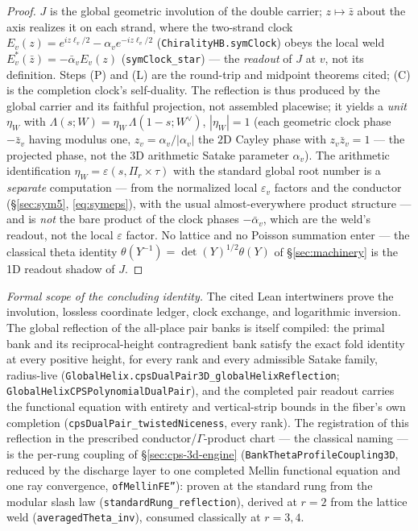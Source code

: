 \documentclass[11pt]{article}
\theoremstyle{definition}
\begin{document}
\begin{proof}
$J$ is the global geometric involution of the double carrier; $z\mapsto\bar z$ about the axis realizes it on
each strand, where the two-strand clock $E_v(z)=e^{iz\ell_v/2}-\alpha_v e^{-iz\ell_v/2}$
(\texttt{ChiralityHB.symClock}) obeys the local weld $E_v^{*}(\bar z)=-\bar\alpha_v E_v(z)$
(\texttt{symClock\_star}) --- the \emph{readout} of $J$ at $v$, not its definition. Steps (P) and (L) are the
round-trip and midpoint theorems cited; (C) is the completion clock's self-duality. The reflection is thus
produced by the global carrier and its faithful projection, not assembled placewise; it yields a \emph{unit}
$\eta_W$ with $\Lambda(s;W)=\eta_W\,\Lambda(1-s;W^\vee)$, $|\eta_W|=1$ (each geometric clock phase
$-\bar z_v$ having modulus one, $z_v=\alpha_v/|\alpha_v|$ the $2$D Cayley phase with $z_v\bar z_v=1$ --- the
projected phase, not the $3$D arithmetic Satake parameter $\alpha_v$). The arithmetic identification
$\eta_W=\varepsilon(s,\Pi_r\times\tau)$
with the standard global root number is a \emph{separate} computation --- from the normalized local
$\varepsilon_v$ factors and the conductor (\S\ref{sec:sym5}, \eqref{eq:symeps}), with the usual
almost-everywhere product structure --- and is \emph{not} the bare product of the clock phases $-\bar\alpha_v$,
which are the weld's readout, not the local $\varepsilon$ factor. No lattice and no Poisson summation enter ---
the classical theta identity $\theta(Y^{-1})=\det(Y)^{1/2}\theta(Y)$ of \S\ref{sec:machinery} is the 1D readout
shadow of $J$.
\end{proof}

\noindent\emph{Formal scope of the concluding identity.}
The cited Lean intertwiners prove the involution, lossless coordinate ledger, clock exchange, and
logarithmic inversion.  The global reflection of the all-place pair banks is itself compiled: the primal
bank and its reciprocal-height contragredient bank satisfy the exact fold identity at every positive
height, for every rank and every admissible Satake family, radius-live
(\texttt{GlobalHelix.cpsDualPair3D\_globalHelixReflection};
\texttt{GlobalHelixCPSPolynomialDualPair}), and the completed pair readout carries the functional
equation with entirety and vertical-strip bounds in the fiber's own completion
(\texttt{cpsDualPair\_twistedNiceness}, every rank).  The registration of this reflection in the
prescribed conductor/$\Gamma$-product chart --- the classical naming --- is the per-rung coupling of
\S\ref{sec:cps-3d-engine} (\texttt{BankThetaProfileCoupling3D}, reduced by the discharge layer to one
completed Mellin functional equation and one ray convergence, \texttt{ofMellinFE''}): proven at the
standard rung from the modular slash law (\texttt{standardRung\_reflection}), derived at $r=2$ from the
lattice weld (\texttt{averagedTheta\_inv}), consumed classically at $r=3,4$.
\end{document}
